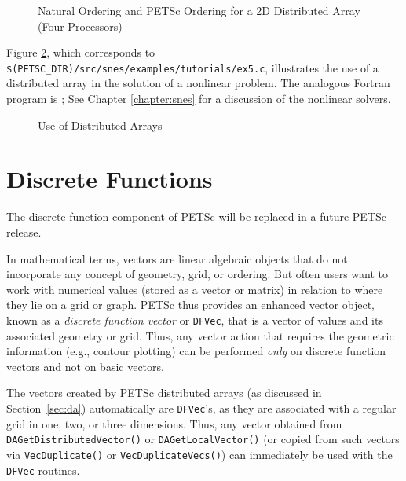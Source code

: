\begin{figure}[tb]
\centerline{}
\caption{Natural Ordering and PETSc Ordering for a 2D Distributed Array (Four Processors)}
\label{fig:daao}
\end{figure}

Figure \ref{fig:daexample}, which corresponds to
{\tt \$(PETSC\_DIR)/src/snes/examples/tutorials/ex5.c},
illustrates the use of a distributed array in the solution of
a nonlinear problem.  The analogous Fortran program is
;
See Chapter \ref{chapter:snes} for a discussion of the nonlinear
solvers.

\begin{figure}[H]
{\small
{}
}
\caption{Use of Distributed Arrays}
\label{fig:daexample}
\end{figure}

\section{Discrete Functions}

The discrete function component of PETSc will be replaced in a future 
PETSc release.

\medskip \medskip

In mathematical terms, vectors are linear algebraic objects that do
not incorporate any concept of geometry, grid, or ordering.  But often
users want to work with numerical values (stored as a vector or
matrix) in relation to where they lie on a grid or graph. PETSc thus
provides an enhanced vector object, known as a {\em discrete function
vector} or {\tt DFVec}, that is a vector of values and its associated
geometry or grid.  Thus, any vector action that requires the
geometric information (e.g., contour plotting) can be performed {\em only} on
discrete function vectors and not on basic vectors.

The vectors created by PETSc distributed arrays (as discussed in
Section~\ref{sec:da}) automatically are {\tt DFVec}'s, as they 
are associated with a regular grid in one, two, or three dimensions.  Thus,
any vector obtained from {\tt DAGetDistributedVector()} or
{\tt DAGetLocalVector()} (or copied from such vectors via {\tt VecDuplicate()}
or {\tt VecDuplicateVecs()}) can immediately be used with the {\tt DFVec}
routines.

